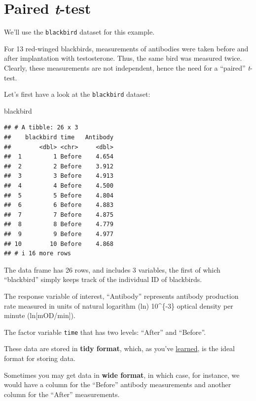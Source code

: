 \documentclass[
]{book}
\newenvironment{Shaded}{\begin{snugshade}}{\end{snugshade}}
\newcommand{\NormalTok}[1]{#1}
\begin{document}
\section{\texorpdfstring{Paired \emph{t}-test}{Paired t-test}}\label{paired-t-test}

We'll use the \texttt{blackbird} dataset for this example.

For 13 red-winged blackbirds, measurements of antibodies were taken before and after implantation with testosterone. Thus, the same bird was measured twice. Clearly, these measurements are not independent, hence the need for a ``paired'' \emph{t}-test.

Let's first have a look at the \texttt{blackbird} dataset:

\begin{Shaded}
\begin{Highlighting}[]
\NormalTok{blackbird }
\end{Highlighting}
\end{Shaded}

\begin{verbatim}
## # A tibble: 26 x 3
##    blackbird time   Antibody
##        <dbl> <chr>     <dbl>
##  1         1 Before    4.654
##  2         2 Before    3.912
##  3         3 Before    4.913
##  4         4 Before    4.500
##  5         5 Before    4.804
##  6         6 Before    4.883
##  7         7 Before    4.875
##  8         8 Before    4.779
##  9         9 Before    4.977
## 10        10 Before    4.868
## # i 16 more rows
\end{verbatim}

The data frame has 26 rows, and includes 3 variables, the first of which ``blackbird'' simply keeps track of the individual ID of blackbirds.

The response variable of interest, ``Antibody'' represents antibody production rate measured in units of natural logarithm (ln) 10\^{}\{-3\} optical density per minute (ln{[}mOD/min{]}).

The factor variable \texttt{time} that has two levels: ``After'' and ``Before''.

These data are stored in \textbf{tidy format}, which, as you've \href{https://ubco-biology.github.io/Procedures-and-Guidelines/tidy-data.html}{learned}, is the ideal format for storing data.

Sometimes you may get data in \textbf{wide format}, in which case, for instance, we would have a column for the ``Before'' antibody measurements and another column for the ``After'' measurements.
\end{document}
